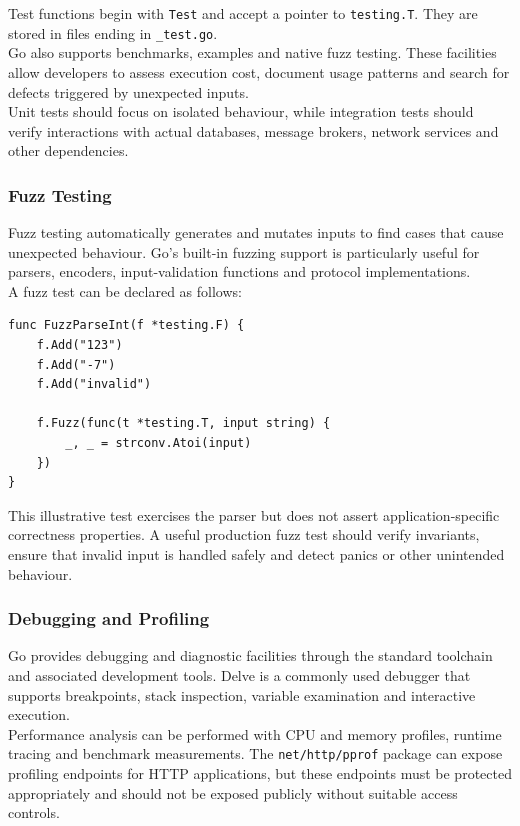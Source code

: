 Test functions begin with \texttt{Test} and accept a pointer to \texttt{testing.T}. They are stored in files ending in \texttt{\_test.go}.\\

Go also supports benchmarks, examples and native fuzz testing. These facilities allow developers to assess execution cost, document usage patterns and search for defects triggered by unexpected inputs.\\

Unit tests should focus on isolated behaviour, while integration tests should verify interactions with actual databases, message brokers, network services and other dependencies.

\subsubsection{Fuzz Testing}

Fuzz testing automatically generates and mutates inputs to find cases that cause unexpected behaviour. Go's built-in fuzzing support is particularly useful for parsers, encoders, input-validation functions and protocol implementations.\\

A fuzz test can be declared as follows:

\begin{lstlisting}
func FuzzParseInt(f *testing.F) {
    f.Add("123")
    f.Add("-7")
    f.Add("invalid")

    f.Fuzz(func(t *testing.T, input string) {
        _, _ = strconv.Atoi(input)
    })
}
\end{lstlisting}

This illustrative test exercises the parser but does not assert application-specific correctness properties. A useful production fuzz test should verify invariants, ensure that invalid input is handled safely and detect panics or other unintended behaviour.

\subsubsection{Debugging and Profiling}

Go provides debugging and diagnostic facilities through the standard toolchain and associated development tools. Delve is a commonly used debugger that supports breakpoints, stack inspection, variable examination and interactive execution.\\

Performance analysis can be performed with CPU and memory profiles, runtime tracing and benchmark measurements. The \texttt{net/http/pprof} package can expose profiling endpoints for HTTP applications, but these endpoints must be protected appropriately and should not be exposed publicly without suitable access controls.\\

